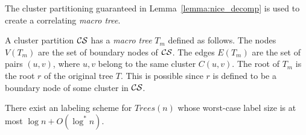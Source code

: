 			

The cluster partitioning guaranteed in Lemma~\ref{lemma:nice_decomp} is used to  create a correlating \emph{macro tree}.
\begin{definition}\label{dfn:macro-tree}
A cluster partition $ \mathcal{CS}$ has  a \emph{macro tree} $T_m$ defined as follows. 
The nodes $V(T_m)$ are the set of boundary nodes of  $ \mathcal{CS}$.
The edges $E(T_m)$ are the set of pairs $(u,v)$, where $u,v$ belong to the same cluster $C(u,v)$. 
The root of $T_m$ is the root $r$ of the original tree $T$.
This is possible since $r$  is defined to be a boundary node of some cluster in $ \mathcal{CS}$.
\end{definition}


			
			
\begin{theorem}\label{theo:adjacencytreesupper}\cite{Alstrup02}
There exist an \adjacency labeling scheme for $Trees(n)$ whose worst-case label size is at most $\log n + O(\log^* n)$.
\end{theorem}

